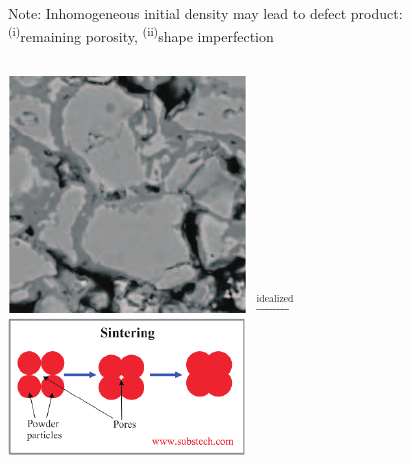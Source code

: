 \documentclass[11pt,mathserif]{beamer}
\begin{document}
\begin{frame}
\begin{enumerate}
 \end{enumerate}
\alert{Note: Inhomogeneous initial density may lead to defect product:\\ \textsuperscript{(i)}remaining porosity, \textsuperscript{(ii)}shape imperfection }
\begin{center}
 \begin{columns}
 \centering
 \includegraphics[width=\textwidth]{figures/sinter_1-crop.pdf}
 \centering
 $\xrightarrow{\text{idealized}}$
 \centering
 \includegraphics[width=\textwidth]{figures/sinter_2-crop.pdf}
  
 \end{columns}

\end{center}
\end{frame}
\end{document}
